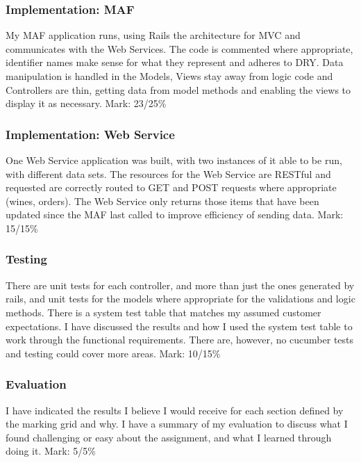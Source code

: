 \documentclass[12pt]{article}
\begin{document}
\subsubsection{Implementation: MAF}
My MAF application runs, using Rails the architecture for MVC and communicates with the Web Services. The code is commented where appropriate, identifier names make sense for what they represent and adheres to DRY. Data manipulation is handled in the Models, Views stay away from logic code and Controllers are thin, getting data from model methods and enabling the views to display it as necessary.
\newline
Mark: 23/25\%

\subsubsection{Implementation: Web Service}
One Web Service application was built, with two instances of it able to be run, with different data sets. The resources for the Web Service are RESTful and requested are correctly routed to GET and POST requests where appropriate (wines, orders). The Web Service only returns those items that have been updated since the MAF last called to improve efficiency of sending data.
\newline
Mark: 15/15\%

\subsubsection{Testing}
There are unit tests for each controller, and more than just the ones generated by rails, and unit tests for the models where appropriate for the validations and logic methods. There is a system test table that matches my assumed customer expectations. I have discussed the results and how I used the system test table to work through the functional requirements. There are, however, no cucumber tests and testing could cover more areas.
\newline
Mark: 10/15\%

\subsubsection{Evaluation}
I have indicated the results I believe I would receive for each section defined by the marking grid and why. I have a summary of my evaluation to discuss what I found challenging or easy about the assignment, and what I learned through doing it.
\newline
Mark: 5/5\%
\end{document}
